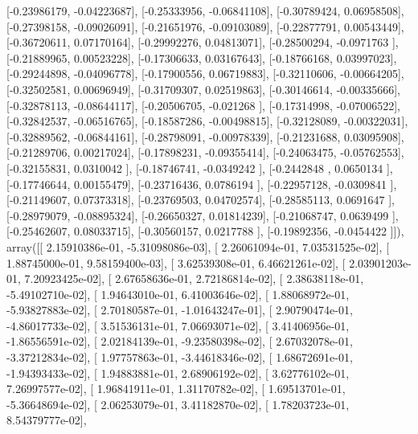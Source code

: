 \documentclass{article}
\begin{document}
       [-0.23986179, -0.04223687],
       [-0.25333956, -0.06841108],
       [-0.30789424,  0.06958508],
       [-0.27398158, -0.09026091],
       [-0.21651976, -0.09103089],
       [-0.22877791,  0.00543449],
       [-0.36720611,  0.07170164],
       [-0.29992276,  0.04813071],
       [-0.28500294, -0.0971763 ],
       [-0.21889965,  0.00523228],
       [-0.17306633,  0.03167643],
       [-0.18766168,  0.03997023],
       [-0.29244898, -0.04096778],
       [-0.17900556,  0.06719883],
       [-0.32110606, -0.00664205],
       [-0.32502581,  0.00696949],
       [-0.31709307,  0.02519863],
       [-0.30146614, -0.00335666],
       [-0.32878113, -0.08644117],
       [-0.20506705, -0.021268  ],
       [-0.17314998, -0.07006522],
       [-0.32842537, -0.06516765],
       [-0.18587286, -0.00498815],
       [-0.32128089, -0.00322031],
       [-0.32889562, -0.06844161],
       [-0.28798091, -0.00978339],
       [-0.21231688,  0.03095908],
       [-0.21289706,  0.00217024],
       [-0.17898231, -0.09355414],
       [-0.24063475, -0.05762553],
       [-0.32155831,  0.0310042 ],
       [-0.18746741, -0.0349242 ],
       [-0.2442848 ,  0.0650134 ],
       [-0.17746644,  0.00155479],
       [-0.23716436,  0.0786194 ],
       [-0.22957128, -0.0309841 ],
       [-0.21149607,  0.07373318],
       [-0.23769503,  0.04702574],
       [-0.28585113,  0.0691647 ],
       [-0.28979079, -0.08895324],
       [-0.26650327,  0.01814239],
       [-0.21068747,  0.0639499 ],
       [-0.25462607,  0.08033715],
       [-0.30560157,  0.0217788 ],
       [-0.19892356, -0.0454422 ]]), array([[  2.15910386e-01,  -5.31098086e-03],
       [  2.26061094e-01,   7.03531525e-02],
       [  1.88745000e-01,   9.58159400e-03],
       [  3.62539308e-01,   6.46621261e-02],
       [  2.03901203e-01,   7.20923425e-02],
       [  2.67658636e-01,   2.72186814e-02],
       [  2.38638118e-01,  -5.49102710e-02],
       [  1.94643010e-01,   6.41003646e-02],
       [  1.88068972e-01,  -5.93827883e-02],
       [  2.70180587e-01,  -1.01643247e-01],
       [  2.90790474e-01,  -4.86017733e-02],
       [  3.51536131e-01,   7.06693071e-02],
       [  3.41406956e-01,  -1.86556591e-02],
       [  2.02184139e-01,  -9.23580398e-02],
       [  2.67032078e-01,  -3.37212834e-02],
       [  1.97757863e-01,  -3.44618346e-02],
       [  1.68672691e-01,  -1.94393433e-02],
       [  1.94883881e-01,   2.68906192e-02],
       [  3.62776102e-01,   7.26997577e-02],
       [  1.96841911e-01,   1.31170782e-02],
       [  1.69513701e-01,  -5.36648694e-02],
       [  2.06253079e-01,   3.41182870e-02],
       [  1.78203723e-01,   8.54379777e-02],
\end{document}
